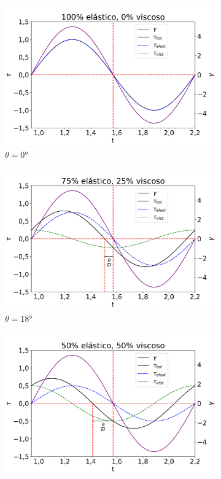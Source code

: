 			
			\begin{figure}[H]
				\begin{subfigure}[t]{0.3\textwidth}
					\centering
					\includegraphics[width=\textwidth]{./imagens/reologia/Simulacao_visc_0}
					\caption{\(\theta=0°\)}
					\label{fig:osc_sim0}
				\end{subfigure}%
				\begin{subfigure}[t]{0.3\textwidth}
					\centering
					\includegraphics[width=\textwidth]{./imagens/reologia/Simulacao_visc_25}
					\caption{\(\theta=18°\)}
					\label{fig:osc_sim25}
				\end{subfigure}%
				\begin{subfigure}[t]{0.3\textwidth}
					\centering
					\includegraphics[width=\textwidth]{./imagens/reologia/Simulacao_visc_50}

\end{subfigure}
\end{figure}
